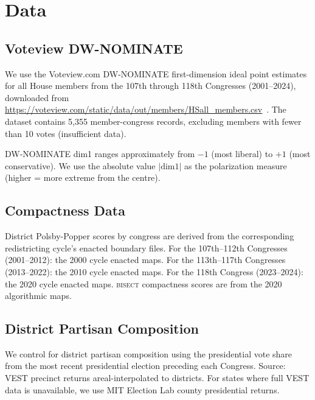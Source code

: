 \section{Data}

\subsection{Voteview DW-NOMINATE}

We use the Voteview.com DW-NOMINATE first-dimension ideal point estimates
for all House members from the 107th through 118th Congresses (2001--2024),
downloaded from \url{https://voteview.com/static/data/out/members/HSall\_members.csv}~\citep{lewis2024voteview}.
The dataset contains 5{,}355 member-congress records, excluding members
with fewer than 10 votes (insufficient data).

DW-NOMINATE dim1 ranges approximately from $-1$ (most liberal)
to $+1$ (most conservative).
We use the absolute value $|\text{dim1}|$ as the polarization measure
(higher = more extreme from the centre).

\subsection{Compactness Data}

District Polsby-Popper scores by congress are derived from the corresponding
redistricting cycle's enacted boundary files.
For the 107th--112th Congresses (2001--2012): the 2000 cycle enacted maps.
For the 113th--117th Congresses (2013--2022): the 2010 cycle enacted maps.
For the 118th Congress (2023--2024): the 2020 cycle enacted maps.
\textsc{bisect} compactness scores are from the 2020 algorithmic maps.

\subsection{District Partisan Composition}

We control for district partisan composition using the presidential vote
share from the most recent presidential election preceding each Congress.
Source: VEST precinct returns areal-interpolated to districts.
For states where full VEST data is unavailable, we use MIT Election Lab
county presidential returns.
